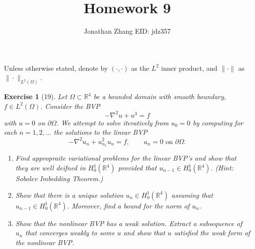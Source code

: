 \documentclass[letterpaper,twoside,11pt]{article}
\theoremstyle{mystyle}
\newtheorem*{exercise}{Exercise}
\newcommand{\R}{{\mathbb R}}
\begin{document}
\title{\vspace{-2\baselineskip} 
Homework 9
}
\author{Jonathan Zhang \qquad EID: { jdz357} }
\date{}
\maketitle


Unless otherwise stated, denote by $\left( \cdot, \cdot \right)$ as the $L^2$ inner product, and $\|\cdot\|$ as $\|\cdot \|_{L^2\left( \Omega \right)}$. 

\begin{exercise}[19]
	Let $\Omega \subset \R^4$ be a bounded domain with smooth boundary, $f \in L^2 (\Omega)$. Consider the BVP 
	\[-\nabla^2 u + u^3 = f\]
	with $u = 0$ on $\partial \Omega$.
  We attempt to solve iteratively from $u_0 = 0$ by computing for each $n = 1, 2,\dots$ the solutions to the linear BVP 
  \[-\nabla^2 u_n + u_{n_1}^2 u_n = f,\qquad u_n = 0 \text{ on }\partial \Omega.\]
  \begin{enumerate}
    \item Find appropraite variational problems for the linear BVP's and show that they are well deifned in $H_0^1 \left( \R^4 \right)$ provided that $u_{n-1} \in H_0^1 \left( \R^4 \right)$. (Hint: Sobolev Imbedding Theorem.)
    \item Show that there is a unique solution $u_n \in H_0^1 \left( \R^4 \right)$ assuming that $u_{n-1} \in H_0^1 (\R^4)$. Moreover, find a bound for the norm of $u_n$. 
    \item Show that the nonlinear BVP has a weak solution. Extract a subsequence of $u_n$ that converges weakly to some $u$ and show that $u$ satisfied the weak form of the nonlinear BVP. 
  \end{enumerate}
\end{exercise}
\end{document}
